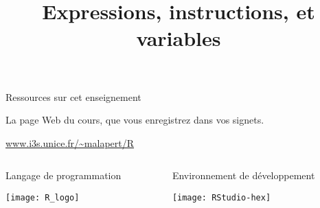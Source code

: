 \documentclass[10pt]{beamer}
\title{Expressions, instructions, et variables}
\begin{document}
\maketitle


\begin{frame}{Ressources sur cet enseignement}

  \begin{alertblock}{La page Web du cours, que vous enregistrez dans vos signets.}
    \begin{center}
      \url{www.i3s.unice.fr/~malapert/R}
    \end{center}

  \end{alertblock}
  
\begin{columns}[t]
\begin{column}{0.48\textwidth}
  \begin{block}{Langage de programmation}
    \begin{center}
      \texttt{[image: R\_logo]}
    \end{center}
  \end{block}
\end{column}
\begin{column}{0.51\textwidth}
  \begin{block}{Environnement de développement}
    \begin{center}
      \texttt{[image: RStudio-hex]}          
    \end{center}
  \end{block}
\end{column}
\end{columns}

\end{frame}
\end{document}

